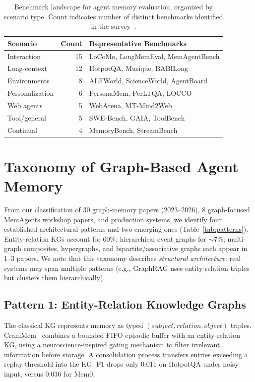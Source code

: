 \documentclass[hf]{ceurart}
\begin{document}
\begin{table}[t]
\caption{Benchmark landscape for agent memory evaluation, organized by
  scenario type. Count indicates number of distinct benchmarks
  identified in the survey~\cite{graphmemsurvey2026}.}
\label{tab:benchmarks}
\centering\small
\begin{tabular}{@{}lrl@{}}
\toprule
\textbf{Scenario} & \textbf{Count} & \textbf{Representative Benchmarks} \\
\midrule
Interaction & 15 & LoCoMo, LongMemEval, MemAgentBench \\
Long-context & 12 & HotpotQA, Musique, BABILong \\
Environments & 8 & ALFWorld, ScienceWorld, AgentBoard \\
Personalization & 6 & PersonaMem, PerLTQA, LOCCO \\
Web agents & 5 & WebArena, MT-Mind2Web \\
Tool/general & 5 & SWE-Bench, GAIA, ToolBench \\
Continual & 4 & MemoryBench, StreamBench \\
\bottomrule
\end{tabular}
\end{table}


\section{Taxonomy of Graph-Based Agent Memory}
\label{sec:taxonomy}

From our classification of 30 graph-memory papers (2023--2026),
8 graph-focused MemAgents workshop papers, and production systems,
we identify four established architectural patterns and two emerging
ones (Table~\ref{tab:patterns}). Entity-relation KGs account for
60\%; hierarchical event graphs for ${\sim}7$\%; multi-graph composites,
hypergraphs, and bipartite/associative graphs each appear in 1--3
papers. We note that this taxonomy describes \emph{structural
architecture}: real systems may span multiple patterns (e.g., GraphRAG
uses entity-relation triples but clusters them hierarchically).

\subsection{Pattern 1: Entity-Relation Knowledge Graphs}

The classical KG represents memory as typed
$(subject, relation, object)$ triples. CraniMem~\cite{cranimem2026}
combines a bounded FIFO episodic buffer with an entity-relation KG,
using a neuroscience-inspired gating mechanism to filter irrelevant
information before storage. A consolidation process transfers entries
exceeding a replay threshold into the KG. F1 drops only 0.011 on
HotpotQA under noisy input, versus 0.036 for Mem0.
\end{document}
